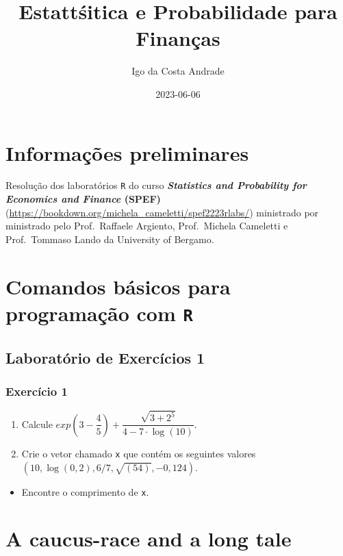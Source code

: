 \documentclass[
]{article}
\title{Estattśitica e Probabilidade para Finanças}
\author{Igo da Costa Andrade}
\date{2023-06-06}
\providecommand{\tightlist}{%
  \setlength{\itemsep}{0pt}\setlength{\parskip}{0pt}}
\begin{document}
\maketitle

{
\setcounter{tocdepth}{2}
\tableofcontents
}
\newpage

\hypertarget{informauxe7uxf5es-preliminares}{%
\section*{Informações preliminares}\label{informauxe7uxf5es-preliminares}}

Resolução dos laboratórios \texttt{R} do curso \textbf{\emph{Statistics and Probability for Economics and Finance} (SPEF)} (\url{https://bookdown.org/michela_cameletti/spef2223rlabs/}) ministrado por ministrado pelo Prof.~Raffaele Argiento, Prof.~Michela Cameletti e Prof.~Tommaso Lando da University of Bergamo.

\hypertarget{comandos-buxe1sicos-para-programauxe7uxe3o-com-r}{%
\section{\texorpdfstring{Comandos básicos para programação com \texttt{R}}{Comandos básicos para programação com R}}\label{comandos-buxe1sicos-para-programauxe7uxe3o-com-r}}

\hypertarget{laboratuxf3rio-de-exercuxedcios-1}{%
\subsection{Laboratório de Exercícios 1}\label{laboratuxf3rio-de-exercuxedcios-1}}

\hypertarget{exercuxedcio-1}{%
\subsubsection{Exercício 1}\label{exercuxedcio-1}}

\begin{enumerate}
\def\labelenumi{\arabic{enumi}.}
\item
  Calcule \(exp\left(3 - \dfrac{4}{5}\right) + \dfrac{\sqrt{3 + 2^5}}{4 - 7 \cdot \log{(10)}}\).
\item
  Crie o vetor chamado \texttt{x} que contém os seguintes valores \(\left(10, \log{(0,2)}, 6/7, \sqrt{(54)}, -0,124\right)\).
\end{enumerate}

\begin{itemize}
\tightlist
\item
  Encontre o comprimento de \texttt{x}.
\end{itemize}

\hypertarget{a-caucus-race-and-a-long-tale}{%
\section{A caucus-race and a long tale}\label{a-caucus-race-and-a-long-tale}}
\end{document}
